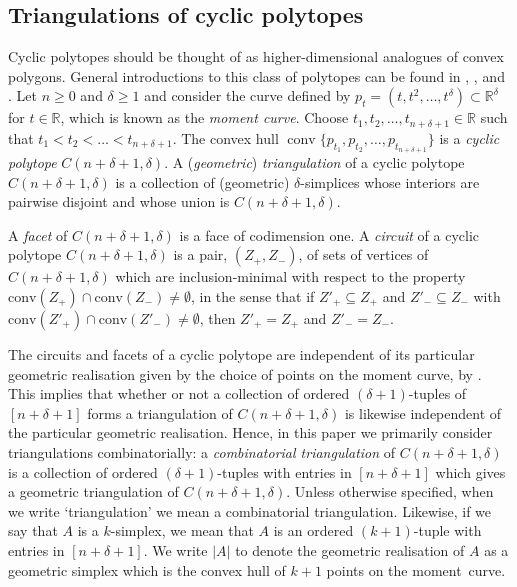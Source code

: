 \documentclass[ALCO,Unicode,published]{cedram}
\DeclareMathOperator{\conv}{conv} %
\begin{document}
\subsection{Triangulations of cyclic polytopes}\label{sect:back:cyc}

Cyclic polytopes should be thought of as higher-dimensional analogues of convex polygons. General introductions to this class of polytopes can be found in \cite[Lecture 0]{ziegler}, \cite[4.7]{gruenbaum}, \cite[Section 6.1]{lrs} and \cite[Chapter VI]{bar}. Let $n \geqslant 0$ and $\delta \geqslant 1$ and consider the curve defined by $p_{t}=(t, t^{2}, \dots , t^{\delta}) \subset \mathbb{R}^{\delta}$ for $t \in \mathbb{R}$, which is known as the \emph{moment curve}. Choose $t_{1}, t_{2}, \dots , t_{n + \delta + 1} \in \mathbb{R}$ such that $t_{1} < t_{2} < \dots < t_{n + \delta + 1}$. The convex hull $\conv\{ p_{t_{1}}, p_{t_{2}}, \dots , p_{t_{n + \delta + 1}} \}$ is a \emph{cyclic polytope} $C(n + \delta + 1, \delta)$. A (\emph{geometric}) \emph{triangulation} of a cyclic polytope $C(n + \delta + 1, \delta)$ is a collection of (geometric) $\delta$-simplices whose interiors are pairwise disjoint and whose union is $C(n + \delta + 1, \delta)$.

A \emph{facet} of $C(n + \delta + 1, \delta)$ is a face of codimension one. A \emph{circuit} of a cyclic polytope $C(n + \delta + 1, \delta)$ is a pair, $(Z_{+}, Z_{-})$, of sets of vertices of $C(n + \delta + 1,\delta)$ which are inclusion-minimal with respect to the property $\mathrm{conv}(Z_{+}) \cap \mathrm{conv}(Z_{-}) \neq \emptyset$, in the sense that if $Z'_{+} \subseteq Z_{+}$ and $Z'_{-} \subseteq Z_{-}$ with $\mathrm{conv}(Z'_{+}) \cap \mathrm{conv}(Z'_{-}) \neq \emptyset$, then $Z'_{+} = Z_{+}$ and $Z'_{-} = Z_{-}$.

The circuits and facets of a cyclic polytope are independent of its particular geometric realisation given by the choice of points on the moment curve, by \cite{gale,breen}. This implies that whether or not a collection of ordered $(\delta + 1)$-tuples of $[n + \delta + 1]$ forms a triangulation of $C(n + \delta + 1, \delta)$ is likewise independent of the particular geometric realisation. Hence, in this paper we primarily consider triangulations combinatorially: a \emph{combinatorial triangulation} of $C(n + \delta + 1, \delta)$ is a collection of ordered $(\delta + 1)$-tuples with entries in $[n + \delta + 1]$ which gives a geometric triangulation of $C(n + \delta + 1, \delta)$. Unless otherwise specified, when we write `triangulation' we mean a combinatorial triangulation. Likewise, if we say that $A$ is a $k$-simplex, we mean that $A$ is an ordered $(k + 1)$-tuple with entries in $[n + \delta + 1]$. We write $|A|$ to denote the geometric realisation of $A$ as a geometric simplex which is the convex hull of $k + 1$ points on the moment~curve. 
\end{document}

